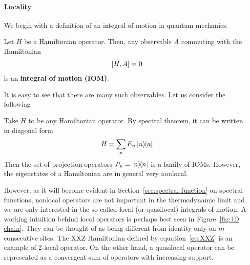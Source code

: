 \paragraph{Locality} We begin with a definition of an integral of motion in quantum mechanics.
\begin{definition}
  Let \(H\) be a Hamiltonian operator. Then, any observable \(A\) commuting with the Hamiltonian
  \begin{equation*}
    \comm{H}{A} = 0
  \end{equation*}
  is an \textbf{integral of motion (IOM)}.\label{def:iom}
\end{definition}
It is easy to see that there are many such observables. Let us consider the following
\begin{example}
  Take \(H\) to be any Hamiltonian operator. By spectral theorem, it can be written in diagonal form
  \begin{equation*}
    H = \sum_n E_n \ketbra{n}{n}
  \end{equation*}
  Then the set of projection operators \(P_n = \ketbra{n}{n}\) is a family of IOMs.
  However, the eigenstates of a Hamiltonian are in general very nonlocal.\label{ex: projectors}
\end{example}
However, as it will become evident in Section~\ref{sec:spectral function} on spectral functions, nonlocal operators are not important in the
thermodynamic limit and we are only interested in the so-called local (or quasilocal) integrals of motion.
A working intuition behind local operators is perhaps best seen in Figure~\ref{fig:1D chain}. They can be thought of as
being different from identity only on \(m\) consecutive sites. The XXZ Hamiltonian defined by equation~\eqref{eq:XXZ} is an
example of 2-local operator. On the other hand, a quasilocal operator can be represented as a convergent sum of operators
with increasing support.
